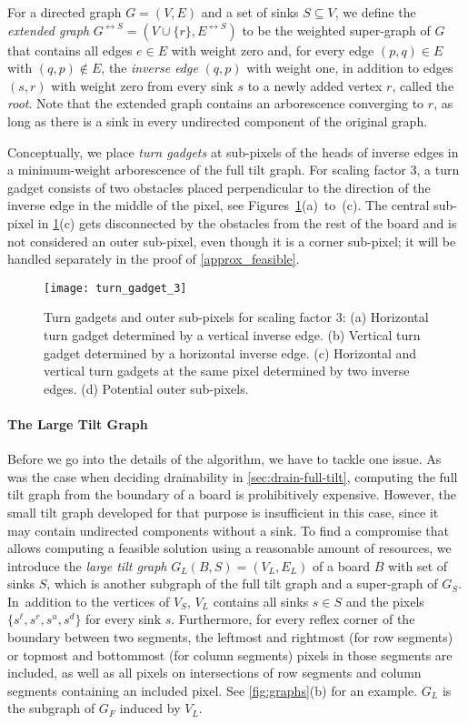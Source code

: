 \documentclass[a4paper,UKenglish,cleveref,thm-restate]{lipics-v2021}
\newcommand{\gExt}[1][G]{\ensuremath{{#1}^{\leftrightarrow S}}}
\begin{document}
For a directed graph $G=(V,E)$ and a set of sinks $S \subseteq V$, we define
the \emph{extended graph} \(\gExt=(V \cup \{r\} ,\gExt[E])\) to be the weighted
super-graph of $G$ that contains all edges $e \in E$ with weight zero and, for
every edge $(p,q) \in E$ with \((q,p) \notin E\), the \emph{inverse edge}
$(q,p)$ with weight one, in addition to edges $(s,r)$ with weight zero from
every sink $s$ to a newly added vertex $r$, called the \emph{root}. Note that
the extended graph contains an arborescence converging to $r$, as long as there
is a sink in every undirected component of the original graph.

Conceptually, we place \emph{turn gadgets} at sub-pixels of the heads of inverse
edges in a minimum-weight arborescence of the full tilt graph. For scaling
factor $3$, a turn gadget consists of two obstacles placed perpendicular to the
direction of the inverse edge in the middle of the pixel,
see Figures~\ref{fig:turn_gadget_3}(a)~to~(c). The central sub-pixel
in \cref{fig:turn_gadget_3}(c) gets disconnected by the obstacles from the rest
of the board and is not considered an outer sub-pixel, even though it is a
corner sub-pixel; it will be handled separately in the proof
of \cref{approx_feasible}.

\begin{figure}[htb]
\centering
\texttt{[image: turn\_gadget\_3]}\caption{Turn gadgets and outer sub-pixels for scaling factor 3: (a) Horizontal
turn gadget determined by a vertical inverse edge. (b) Vertical turn gadget
determined by a horizontal inverse edge. (c) Horizontal and vertical turn
gadgets at the same pixel determined by two inverse edges. (d) Potential outer
sub-pixels.}\label{fig:turn_gadget_3}
\end{figure}

\paragraph*{The Large Tilt Graph}

Before we go into the details of the algorithm, we have to tackle one issue. As
was the case when deciding drainability in \cref{sec:drain-full-tilt}, computing
the full tilt graph from the boundary of a board is prohibitively expensive.
However, the small tilt graph developed for that purpose is insufficient in this
case, since it may contain undirected components without a sink.
To find a compromise that allows computing a feasible solution using a
reasonable amount of resources, we
introduce the \emph{large tilt graph} $G_L(B,S)=(V_L,E_L)$ of a board $B$ with
set of sinks $S$, which is another subgraph of the full tilt graph and a
super-graph of $G_S$. In~addition to the vertices of $V_S$, $V_L$ contains all
sinks \(s \in S\) and the pixels \(\{s^{\ell}, s^r, s^u, s^d\}\) for every sink
$s$.  Furthermore, for every reflex corner of the boundary between two segments,
the leftmost and rightmost (for row segments) or topmost and bottommost (for
column segments) pixels in those segments are included, as well as all pixels on
intersections of row segments and column segments containing an included
pixel. See \cref{fig:graphs}(b) for an example. $G_L$ is the subgraph of $G_F$
induced by $V_L$.
\end{document}
